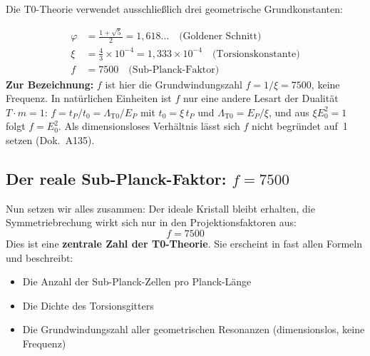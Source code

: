 	Die T0-Theorie verwendet ausschließlich drei geometrische Grundkonstanten:
	
	\begin{align}
		\varphi &= \frac{1 + \sqrt{5}}{2} = 1{,}618\ldots \quad \text{(Goldener Schnitt)} \\
		\xi &= \frac{4}{3} \times 10^{-4} = 1{,}333 \times 10^{-4} \quad \text{(Torsionskonstante)} \\
		f &= 7500 \quad \text{(Sub-Planck-Faktor)}
	\end{align}
	\textbf{Zur Bezeichnung:} $f$ ist hier die Grundwindungszahl $f = 1/\xi = 7500$, keine Frequenz. In natürlichen Einheiten ist $f$ nur eine andere Lesart der Dualität $T\cdot m = 1$: $f = t_P/t_0 = \Lambda_{\text{T0}}/E_P$ mit $t_0 = \xi\,t_P$ und $\Lambda_{\text{T0}} = E_P/\xi$, und aus $\xi E_0^2 = 1$ folgt $f = E_0^2$. Als dimensionsloses Verhältnis lässt sich $f$ nicht begründet auf~1 setzen (Dok.~A135).
	\subsection{Der reale Sub-Planck-Faktor: \(f = 7500\)}
	Nun setzen wir alles zusammen: Der ideale Kristall bleibt erhalten, die Symmetriebrechung wirkt sich nur in den Projektionsfaktoren aus:
	\begin{equation}
		\boxed{f = 7500}
	\end{equation}
	Dies ist eine \textbf{zentrale Zahl der T0-Theorie}. Sie erscheint in fast allen Formeln und beschreibt:
	\begin{itemize}
		\item Die Anzahl der Sub-Planck-Zellen pro Planck-Länge
		\item Die Dichte des Torsionsgitters
		\item Die Grundwindungszahl aller geometrischen Resonanzen (dimensionslos, keine Frequenz)
	\end{itemize}
